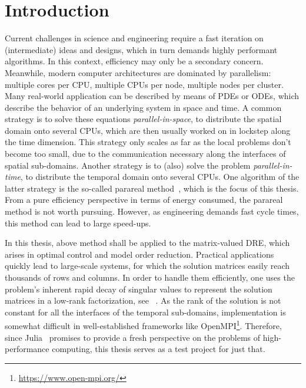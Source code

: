 \chapter{Introduction}

Current challenges in science and engineering require a fast iteration on (intermediate) ideas and designs,
which in turn demands highly performant algorithms.
In this context, efficiency may only be a secondary concern.
Meanwhile, modern computer architectures are dominated by parallelism:
multiple cores per CPU,
multiple CPUs per node,
multiple nodes per cluster.
Many real-world application can be described by means of \acp{PDE} or \acp{ODE},
which describe the behavior of an underlying system in space and time.
A common strategy is to solve these equations \emph{parallel-in-space},
\ie to distribute the spatial domain onto several CPUs,
which are then usually worked on in lockstep along the time dimension.
This strategy only scales as far as the local problems don't become too small,
due to the communication necessary along the interfaces of spatial sub-domains.
Another strategy is to (also) solve the problem \emph{parallel-in-time},
\ie to distribute the temporal domain onto several CPUs.
One algorithm of the latter strategy is the so-called parareal method~\cite{Lions2001},
which is the focus of this thesis.
From a pure efficiency perspective in terms of energy consumed,
the parareal method is not worth pursuing.
However, as engineering demands fast cycle times,
this method can lead to large speed-ups.

In this thesis, above method shall be applied to the matrix-valued \ac{DRE},
which arises \eg in optimal control and model order reduction.
Practical applications quickly lead to large-scale systems,
for which the solution matrices easily reach thousands of rows and columns.
In order to handle them efficiently,
one uses the problem's inherent rapid decay of singular values
to represent the solution matrices in a low-rank factorization, see \eg~\cite{Penzl2000,Kuerschner2016,Lang2017}.
As the rank of the solution is not constant for all the interfaces of the temporal sub-domains,
implementation is somewhat difficult in well-established frameworks like OpenMPI\footnote{%
  \url{https://www.open-mpi.org/}
}.
Therefore, since Julia~\cite{Julia} promises to provide a fresh perspective on the problems of high-performance computing,
this thesis serves as a test project for just that.

